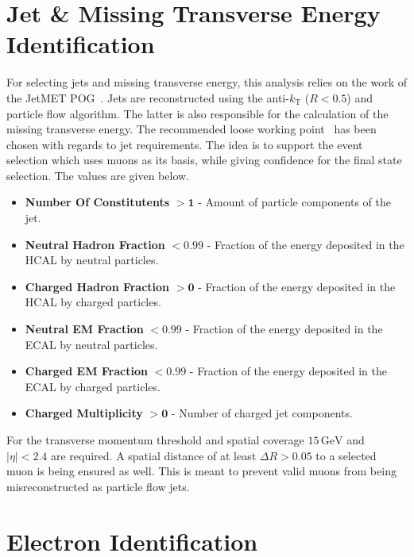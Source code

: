 \section{Jet \& Missing Transverse Energy Identification}
\label{sec:jetid}

For selecting jets and missing transverse energy, this analysis relies on the work of the JetMET POG~\cite{jmepog}. Jets are reconstructed using the anti-$k_{\text{T}}$ ($R < 0.5$) and particle flow algorithm. The latter is also responsible for the calculation of the missing transverse energy. The recommended loose working point~\cite{jetid, jetidpf} has been chosen with regards to jet requirements. The idea is to support the event selection which uses muons as its basis, while giving confidence for the final state selection. The values are given below.

\begin{itemize}
\item \textbf{Number Of Constitutents} $\mathbf{> 1}$ - Amount of particle components of the jet.
\item \textbf{Neutral Hadron Fraction} $\mathbf{< 0.99}$ - Fraction of the energy deposited in the HCAL by neutral particles.
\item \textbf{Charged Hadron Fraction} $\mathbf{> 0}$ - Fraction of the energy deposited in the HCAL by charged particles.
\item \textbf{Neutral EM Fraction} $\mathbf{< 0.99}$ - Fraction of the energy deposited in the ECAL by neutral particles.
\item \textbf{Charged EM Fraction} $\mathbf{< 0.99}$ - Fraction of the energy deposited in the ECAL by charged particles.
\item \textbf{Charged Multiplicity} $\mathbf{> 0}$ - Number of charged jet components.
\end{itemize}

For the transverse momentum threshold and spatial coverage $15\,\text{GeV}$ and $|\eta|  < 2.4$ are required. A spatial distance of at least $\Delta R > 0.05$ to a selected muon is being ensured as well. This is meant to prevent valid muons from being misreconstructed as particle flow jets. 

\section{Electron Identification}
\label{sec:eleid}

